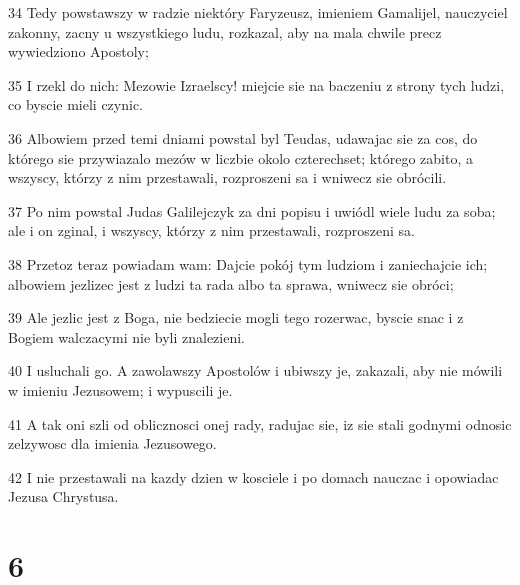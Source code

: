 \par 34 Tedy powstawszy w radzie niektóry Faryzeusz, imieniem Gamalijel, nauczyciel zakonny, zacny u wszystkiego ludu, rozkazal, aby na mala chwile precz wywiedziono Apostoly;
\par 35 I rzekl do nich: Mezowie Izraelscy! miejcie sie na baczeniu z strony tych ludzi, co byscie mieli czynic.
\par 36 Albowiem przed temi dniami powstal byl Teudas, udawajac sie za cos, do którego sie przywiazalo mezów w liczbie okolo czterechset; którego zabito, a wszyscy, którzy z nim przestawali, rozproszeni sa i wniwecz sie obrócili.
\par 37 Po nim powstal Judas Galilejczyk za dni popisu i uwiódl wiele ludu za soba; ale i on zginal, i wszyscy, którzy z nim przestawali, rozproszeni sa.
\par 38 Przetoz teraz powiadam wam: Dajcie pokój tym ludziom i zaniechajcie ich; albowiem jezlizec jest z ludzi ta rada albo ta sprawa, wniwecz sie obróci;
\par 39 Ale jezlic jest z Boga, nie bedziecie mogli tego rozerwac, byscie snac i z Bogiem walczacymi nie byli znalezieni.
\par 40 I usluchali go. A zawolawszy Apostolów i ubiwszy je, zakazali, aby nie mówili w imieniu Jezusowem; i wypuscili je.
\par 41 A tak oni szli od oblicznosci onej rady, radujac sie, iz sie stali godnymi odnosic zelzywosc dla imienia Jezusowego.
\par 42 I nie przestawali na kazdy dzien w kosciele i po domach nauczac i opowiadac Jezusa Chrystusa.

\chapter{6}

